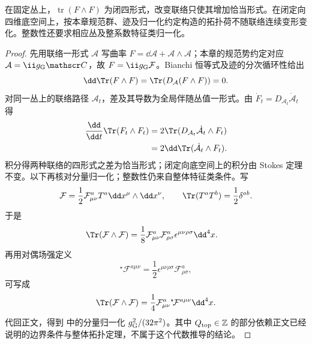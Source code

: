 \begin{proposition}
在固定丛上，$\operatorname{tr}(F\wedge F)$ 为闭四形式，改变联络只使其增加恰当形式。在闭定向四维底空间上，按本章规范群、迹及归一化约定构造的拓扑荷不随联络连续变形变化。整数性还要求相应丛及整系数特征类归一化。
\end{proposition}
\begin{proof}
先用联络一形式 $\mathcal A$ 写曲率 $F=\dd\mathcal A+\mathcal A\wedge\mathcal A$；本章的规范势约定对应 $\mathcal A=\ii g_{\rm G}\mathscr C$，故 $F=\ii g_{\rm G}\mathcal F$。Bianchi 恒等式及迹的分次循环性给出
\[
\dd\Tr(F\wedge F)=\Tr(D_{\mathcal A}(F\wedge F))=0.
\]
对同一丛上的联络路径 $\mathcal A_t$，差及其导数为全局伴随丛值一形式。由 $\dot F_t=D_{\mathcal A_t}\dot{\mathcal A}_t$ 得
\begin{align*}
\frac{\dd}{\dd t}\Tr(F_t\wedge F_t)
&=2\Tr(D_{\mathcal A_t}\dot{\mathcal A}_t\wedge F_t)\\
&=2\dd\Tr(\dot{\mathcal A}_t\wedge F_t).
\end{align*}
积分得两种联络的四形式之差为恰当形式；闭定向底空间上的积分由 Stokes 定理不变。以下再核对分量归一化；整数性仍来自整体特征类条件。写
\begin{equation*}
 \mathcal F=\frac12\mathcal F_{\mu\nu}^aT^a
 \dd x^\mu\wedge\dd x^\nu,
 \qquad
 \Tr(T^aT^b)=\frac12\delta^{ab}.
\end{equation*}
于是
\begin{align*}
 \Tr(\mathcal F\wedge\mathcal F)
 &=\frac18\mathcal F_{\mu\nu}^a\mathcal F_{\rho\sigma}^a
 \epsilon^{\mu\nu\rho\sigma}\dd^4 x.
\end{align*}
再用对偶场强定义
\begin{equation*}
 {}^\star\!\mathcal F^{a\mu\nu}
 =\frac12\epsilon^{\mu\nu\rho\sigma}\mathcal F_{\rho\sigma}^a,
\end{equation*}
可写成
\begin{equation*}
 \Tr(\mathcal F\wedge\mathcal F)
 =\frac14\mathcal F_{\mu\nu}^a
 {}^\star\!\mathcal F^{a\mu\nu}\dd^4 x.
\end{equation*}
代回正文，得到 中的分量归一化 $g_{\rm G}^2/(32\pi^2)$。其中 $Q_{\rm top}\in\mathbb Z$ 的部分依赖正文已经说明的边界条件与整体拓扑定理，不属于这个代数推导的结论。
\end{proof}


